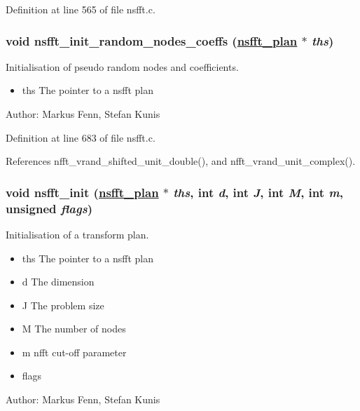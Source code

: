 Definition at line 565 of file nsfft.c.\hypertarget{group__nsfft_ga5}{
\subsubsection[nsfft\_\-init\_\-random\_\-nodes\_\-coeffs]{\setlength{\rightskip}{0pt plus 5cm}void nsfft\_\-init\_\-random\_\-nodes\_\-coeffs (\hyperlink{structnsfft__plan}{nsfft\_\-plan} $\ast$ {\em ths})}}
\label{group__nsfft_ga5}


Initialisation of pseudo random nodes and coefficients. 

\begin{itemize}
\item ths The pointer to a nsfft plan\end{itemize}
\begin{Desc}
\item[Author:]Markus Fenn, Stefan Kunis \end{Desc}


Definition at line 683 of file nsfft.c.

References nfft\_\-vrand\_\-shifted\_\-unit\_\-double(), and nfft\_\-vrand\_\-unit\_\-complex().\hypertarget{group__nsfft_ga6}{
\subsubsection[nsfft\_\-init]{\setlength{\rightskip}{0pt plus 5cm}void nsfft\_\-init (\hyperlink{structnsfft__plan}{nsfft\_\-plan} $\ast$ {\em ths}, int {\em d}, int {\em J}, int {\em M}, int {\em m}, unsigned {\em flags})}}
\label{group__nsfft_ga6}


Initialisation of a transform plan. 

\begin{itemize}
\item ths The pointer to a nsfft plan \item d The dimension \item J The problem size \item M The number of nodes \item m nfft cut-off parameter \item flags\end{itemize}
\begin{Desc}
\item[Author:]Markus Fenn, Stefan Kunis \end{Desc}


